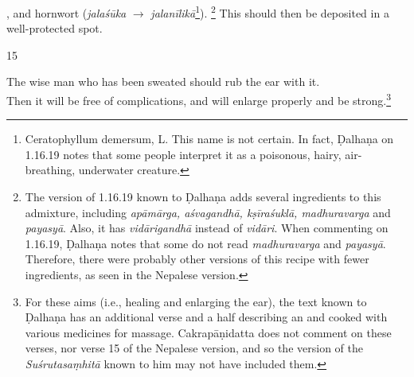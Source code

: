 \begin{translation}
        , %
         and hornwort (\emph{jalaśūka} $\rightarrow$
        \emph{jalanīlikā}\footnote{Ceratophyllum demersum, L. %
            This name is not certain. In fact, Ḍalhaṇa on 1.16.19
            \citep[79]{vulgate} notes that some people interpret it as a
            poisonous, hairy, air-breathing, underwater creature.}).%
            \footnote{The version of 1.16.19 known to Ḍalhaṇa \citep[79]{vulgate}
                adds several ingredients to this admixture, including \emph{apāmārga,
                aśvagandhā, kṣīraśuklā, madhuravarga} and \emph{payasyā}. Also, it has
                \emph{vidārigandhā} instead of \emph{vidāri}. When commenting on
                1.16.19, Ḍalhaṇa \citep[79]{vulgate} notes that some do not read
                \emph{madhuravarga} and \emph{payasyā}. Therefore, there were probably
                other versions of this recipe with fewer ingredients, as seen in the
                Nepalese version.} %
                This should then be deposited in a well-protected spot.
    
\item[15]%
    \begin{sloka}
The wise man who has been sweated should rub the  ear with
it.\\ Then it will be free of complications, and will enlarge properly and be
strong.\footnote{For these aims (i.e., healing and enlarging the ear), the text
    known to Ḍalhaṇa \citep[79]{vulgate} has an additional verse and a half describing
    an  and  cooked
    with various medicines for massage. Cakrapāṇidatta \citep[131]{acar-1939} does not
    comment on these verses, nor verse 15 of the Nepalese version, and so the version
    of the \emph{Suśrutasaṃhitā} known to him may not have included them.}
    \end{sloka}
    

\end{translation}
